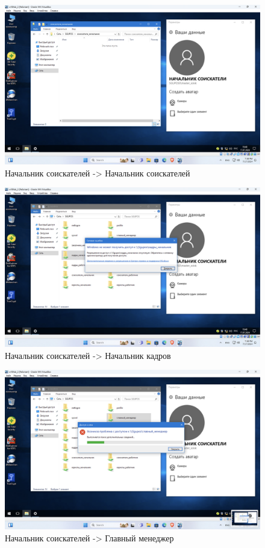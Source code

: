 \begin{figure}[H]
  \centering
  \includegraphics[width=1\textwidth]{pict/prac/37}
  \caption{Начальник соискателей -> Начальник соискателей}
  \label{fig:36}
\end{figure}

\begin{figure}[H]
  \centering
  \includegraphics[width=1\textwidth]{pict/prac/38}
  \caption{Начальник соискателей -> Начальник кадров}
  \label{fig:37}
\end{figure}


\begin{figure}[H]
  \centering
  \includegraphics[width=1\textwidth]{pict/prac/40}
  \caption{Начальник соискателей -> Главный менеджер}
  \label{fig:39}
\end{figure}


